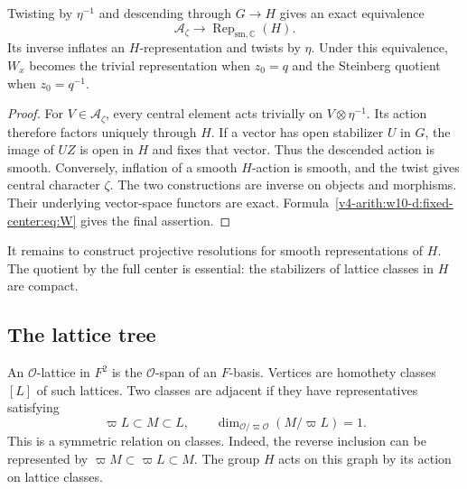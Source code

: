 \begin{lemma}\label{v4-arith:w10-d:fixed-center:lem:twist}
Twisting by $\eta^{-1}$ and descending through $G\to H$ gives an exact equivalence
\[
 \mathcal A_\zeta\longrightarrow\operatorname{Rep}_{\mathrm{sm},\mathbb C}(H).
\]
Its inverse inflates an $H$-representation and twists by $\eta$.
Under this equivalence, $W_x$ becomes the trivial representation when $z_0=q$
and the Steinberg quotient when $z_0=q^{-1}$.
\end{lemma}
\begin{proof}
For $V\in\mathcal A_\zeta$, every central element acts trivially on $V\otimes\eta^{-1}$.
Its action therefore factors uniquely through $H$.
If a vector has open stabilizer $U$ in $G$, the image of $UZ$ is open in $H$ and fixes that vector.
Thus the descended action is smooth.
Conversely, inflation of a smooth $H$-action is smooth, and the twist gives central character $\zeta$.
The two constructions are inverse on objects and morphisms.
Their underlying vector-space functors are exact.
Formula~\eqref{v4-arith:w10-d:fixed-center:eq:W} gives the final assertion.
\end{proof}

It remains to construct projective resolutions for smooth representations of $H$.
The quotient by the full center is essential: the stabilizers of lattice classes in $H$ are compact.

\subsection{The lattice tree}

An $\mathcal O$-lattice in $F^2$ is the $\mathcal O$-span of an $F$-basis.
Vertices are homothety classes $[L]$ of such lattices.
Two classes are adjacent if they have representatives satisfying
\[
 \varpi L\subset M\subset L,\qquad
 \dim_{\mathcal O/\varpi\mathcal O}(M/\varpi L)=1.
\]
This is a symmetric relation on classes.
Indeed, the reverse inclusion can be represented by
$\varpi M\subset\varpi L\subset M$.
The group $H$ acts on this graph by its action on lattice classes.

